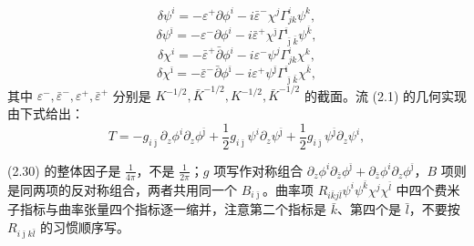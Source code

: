 \begin{equation}\tag{2.34}
\delta\psi^{i}=-\varepsilon^{+}\partial\phi^{i}-i\bar\varepsilon^{-}\chi^{j}\Gamma^{i}_{jk}\psi^{k},
\end{equation}
\begin{equation}\tag{2.35}
\delta\psi^{\bar{\imath}}=-\varepsilon^{-}\partial\phi^{i}-i\bar\varepsilon^{+}\chi^{\bar{\jmath}}\Gamma^{\bar{\imath}}_{\bar{\jmath}\bar{k}}\psi^{\bar{k}},
\end{equation}
\begin{equation}\tag{2.36}
\delta\chi^{i}=-\bar\varepsilon^{+}\bar\partial\phi^{i}-i\varepsilon^{-}\psi^{j}\Gamma^{i}_{jk}\chi^{k},
\end{equation}
\begin{equation}\tag{2.37}
\delta\chi^{\bar{\imath}}=-\bar\varepsilon^{-}\bar\partial\phi^{\bar{\imath}}-i\varepsilon^{+}\psi^{\bar{\jmath}}\Gamma^{\bar{\imath}}_{\bar{\jmath}\bar{k}}\chi^{\bar{k}},
\end{equation}
其中 $\varepsilon^{-},\bar\varepsilon^{-},\varepsilon^{+},\bar\varepsilon^{+}$ 分别是 $K^{-1/2},\bar{K}^{-1/2},K^{-1/2},\bar{K}^{-1/2}$ 的截面。流 (2.1) 的几何实现由下式给出：
\begin{equation}\tag{2.38}
T=-g_{i\bar{\jmath}}\partial_{z}\phi^{i}\partial_{z}\phi^{\bar{\jmath}}+\frac{1}{2}g_{i\bar{\jmath}}\psi^{i}\partial_{z}\psi^{\bar{\jmath}}+\frac{1}{2}g_{i\bar{\jmath}}\psi^{\bar{\jmath}}\partial_{z}\psi^{i},
\end{equation}

\begin{yizhu}[易错点]
(2.30) 的整体因子是 $\frac{1}{4\pi}$，不是 $\frac{1}{2\pi}$；$g$ 项写作对称组合 $\partial_{z}\phi^{i}\partial_{\bar{z}}\phi^{\bar{\jmath}}+\partial_{\bar{z}}\phi^{i}\partial_{z}\phi^{\bar{\jmath}}$，$B$ 项则是同两项的反对称组合，两者共用同一个 $B_{i\bar{\jmath}}$。曲率项 $R_{i\bar{k}j\bar{l}}\psi^{i}\psi^{\bar{k}}\chi^{j}\chi^{\bar{l}}$ 中四个费米子指标与曲率张量四个指标逐一缩并，注意第二个指标是 $\bar{k}$、第四个是 $\bar{l}$，不要按 $R_{i\bar{\jmath}k\bar{l}}$ 的习惯顺序写。
\end{yizhu}

